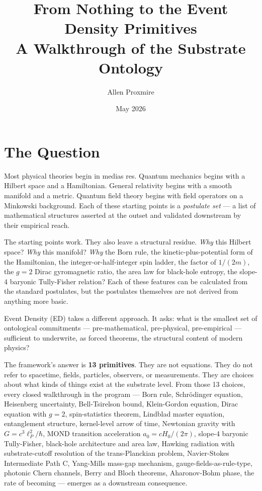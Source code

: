 \documentclass[11pt,a4paper]{article}
\title{\vspace{-1cm}\Large\bfseries From Nothing to the Event Density Primitives\\[6pt]
\large\mdseries A Walkthrough of the Substrate Ontology}
\author{Allen Proxmire}
\date{May 2026}
\begin{document}
\maketitle

\section{The Question}

Most physical theories begin in medias res. Quantum mechanics begins with a Hilbert space and a Hamiltonian. General relativity begins with a smooth manifold and a metric. Quantum field theory begins with field operators on a Minkowski background. Each of these starting points is a \emph{postulate set} --- a list of mathematical structures asserted at the outset and validated downstream by their empirical reach.

The starting points work. They also leave a structural residue. \emph{Why} this Hilbert space? \emph{Why} this manifold? \emph{Why} the Born rule, the kinetic-plus-potential form of the Hamiltonian, the integer-or-half-integer spin ladder, the factor of $1/(2m)$, the $g = 2$ Dirac gyromagnetic ratio, the area law for black-hole entropy, the slope-4 baryonic Tully-Fisher relation? Each of these features can be calculated from the standard postulates, but the postulates themselves are not derived from anything more basic.

Event Density (ED) takes a different approach. It asks: what is the smallest set of ontological commitments --- pre-mathematical, pre-physical, pre-empirical --- sufficient to underwrite, as forced theorems, the structural content of modern physics?

The framework's answer is \textbf{13 primitives}. They are not equations. They do not refer to spacetime, fields, particles, observers, or measurements. They are choices about what kinds of things exist at the substrate level. From those 13 choices, every closed walkthrough in the program --- Born rule, Schr\"odinger equation, Heisenberg uncertainty, Bell-Tsirelson bound, Klein-Gordon equation, Dirac equation with $g = 2$, spin-statistics theorem, Lindblad master equation, entanglement structure, kernel-level arrow of time, Newtonian gravity with $G = c^{3}\ell_P^{2}/\hbar$, MOND transition acceleration $a_0 = c H_0/(2\pi)$, slope-4 baryonic Tully-Fisher, black-hole architecture and area law, Hawking radiation with substrate-cutoff resolution of the trans-Planckian problem, Navier-Stokes Intermediate Path C, Yang-Mills mass-gap mechanism, gauge-fields-as-rule-type, photonic Chern channels, Berry and Bloch theorems, Aharonov-Bohm phase, the rate of becoming --- emerges as a downstream consequence.
\end{document}
